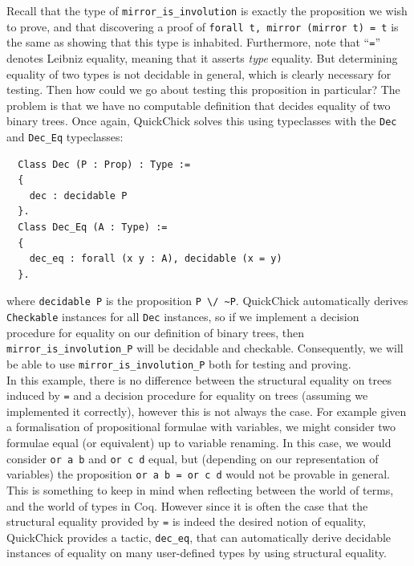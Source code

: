 \documentclass[twoside,11pt,openright]{report}
\newenvironment{code}{\captionsetup{type=figure, singlelinecheck=off, justification=raggedleft}}{}
\newcommand{\coq}[1]{\texttt{#1}}
\begin{document}
Recall that the type of \coq{mirror\_is\_involution} is exactly the proposition we wish to prove, and that discovering a proof of \coq{forall t, mirror (mirror t) = t} is the same as showing that this type is inhabited. Furthermore, note that ``\coq{=}'' denotes Leibniz equality, meaning that it asserts \textit{type} equality. But determining equality of two types is not decidable in general, which is clearly necessary for testing. Then how could we go about testing this proposition in particular? The problem is that we have no computable definition that decides equality of two binary trees. Once again, QuickChick solves this using typeclasses with the \coq{Dec} and \coq{Dec\_Eq} typeclasses:
\begin{code}
\label{def:Dec-Dec_Eq}
\begin{verbatim}
  Class Dec (P : Prop) : Type := 
  { 
    dec : decidable P 
  }.
  Class Dec_Eq (A : Type) :=
  {
    dec_eq : forall (x y : A), decidable (x = y)
  }.
\end{verbatim}
\end{code}
where \coq{decidable P} is the proposition \coq{P \textbackslash/ \textasciitilde P}. QuickChick automatically derives \coq{Checkable} instances for all \coq{Dec} instances, so if we implement a decision procedure for equality on our definition of binary trees, then \coq{mirror\_is\_involution\_P} will be decidable and checkable. Consequently, we will be able to use \coq{mirror\_is\_involution\_P} both for testing and proving.
\medskip\\
In this example, there is no difference between the structural equality on trees induced by \coq{=} and a decision procedure for equality on trees (assuming we implemented it correctly), however this is not always the case. For example given a formalisation of propositional formulae with variables, we might consider two formulae equal (or equivalent) up to variable renaming. In this case, we would consider \coq{or a b} and \coq{or c d} equal, but (depending on our representation of variables) the proposition \coq{or a b = or c d} would not be provable in general. This is something to keep in mind when reflecting between the world of terms, and the world of types in Coq. However since it is often the case that the structural equality provided by \coq{=} is indeed the desired notion of equality, QuickChick provides a tactic, \coq{dec\_eq}, that can automatically derive decidable instances of equality on many user-defined types by using structural equality.
\end{document}
